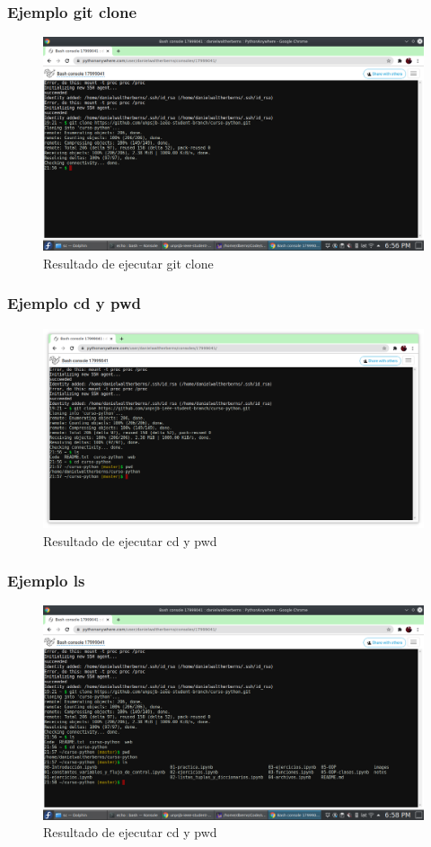 \documentclass[11pt]{beamer}
\begin{document}
\begin{frame}
	\frametitle{Ejemplo git clone}
	\begin{figure}
		\centering
		\includegraphics[width=0.7\linewidth]{sc/git_bravo}
		\caption{Resultado de ejecutar git clone}
	\end{figure}
	
\end{frame}

\begin{frame}
	\frametitle{Ejemplo cd y pwd}
	\begin{figure}
		\centering
		\includegraphics[width=0.7\linewidth]{sc/git_charlie}
		\caption{Resultado de ejecutar cd y pwd}
	\end{figure}
	
\end{frame}

\begin{frame}
	\frametitle{Ejemplo ls}
	\begin{figure}
		\centering
		\includegraphics[width=0.7\linewidth]{sc/git_delta}
		\caption{Resultado de ejecutar cd y pwd}
	\end{figure}
	
\end{frame}
\end{document}
